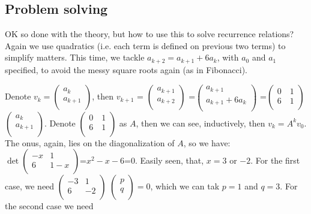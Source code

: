 \documentclass[11pt,a4paper]{article}
\begin{document}
\subsection{Problem solving}
OK so done with the theory, but how to use this to solve recurrence relations? Again we use quadratics (i.e. each term is defined on previous two terms) to simplify matters. This time, we tackle $a_{k+2}=a_{k+1}+6a_{k}$, with $a_0$ and $a_1$ specified, to avoid the messy square roots again (as in Fibonacci).

Denote $v_k=\left( \begin{array}{cc}
a_k\\
a_{k+1}\\
\end{array}\right)$,
then 
$v_{k+1}$ = $\left( \begin{array}{cc}
a_{k+1}\\
a_{k+2}\\
\end{array}\right)$
=$\left( \begin{array}{cc}
a_{k+1}\\
a_{k+1}+6a_k\\
\end{array}\right)$
=$\left(\begin{array}{cc}
0\quad 1\\
6\quad 1\\
\end{array}\right)$
$\left( \begin{array}{cc}
a_{k}\\
a_{k+1}\\
\end{array}\right)$.
Denote $\left(\begin{array}{cc}
0\quad 1\\
6\quad 1\\
\end{array}\right)$ as $A$, then we can see, inductively, then $v_k=A^kv_0$. The onus, again, lies on the diagonalization of $A$, so we have: $\det \left(\begin{array}{cc}
-x & 1\\
6 & 1-x\\
\end{array}\right)$=$x^2-x-6$=0. Easily seen, that, $x=3$ or $-2$. For the first case, we need 
$\left(\begin{array}{cc}
-3 & 1\\
6 & -2\\
\end{array}\right)$
$\left(\begin{array}{cc}
p\\
q\\
\end{array}\right)=0$, which we can tak $p=1$ and $q=3$. For the second case we need 
\end{document}
